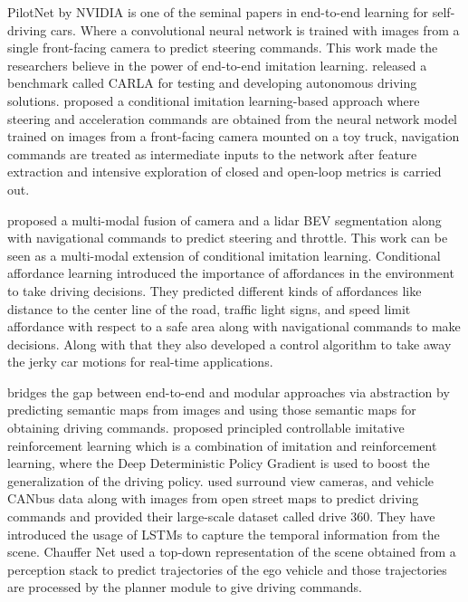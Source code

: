 \cite{DBLP:journals/corr/BojarskiTDFFGJM16} PilotNet by NVIDIA is one of the seminal papers in end-to-end learning for self-driving cars. Where a convolutional neural network is trained with images from a single front-facing camera to predict steering commands.  This work made the researchers believe in the power of end-to-end imitation learning. \cite{DBLP:journals/corr/abs-1711-03938} released a benchmark called CARLA for testing and developing autonomous driving solutions. \cite{DBLP:journals/corr/abs-1710-02410} proposed a conditional imitation learning-based approach where steering and acceleration commands are obtained from the neural network model trained on images from a front-facing camera mounted on a toy truck, navigation commands are treated as intermediate inputs to the network after feature extraction and intensive exploration of closed and open-loop metrics is carried out.

\cite{Sobh2018EndToEndMS} proposed a multi-modal fusion of camera and a lidar BEV segmentation along with navigational commands to predict steering and throttle. This work can be seen as a multi-modal extension of conditional imitation learning. Conditional affordance learning \cite{DBLP:journals/corr/abs-1806-06498} introduced the importance of affordances in the environment to take driving decisions. They predicted different kinds of affordances like distance to the center line of the road, traffic light signs, and speed limit affordance with respect to a safe area along with navigational commands to make decisions. Along with that they also developed a control algorithm to take away the jerky car motions for real-time applications.  


\cite{DBLP:journals/corr/abs-1804-09364} bridges the gap between end-to-end and modular approaches via abstraction by predicting semantic maps from images and using those semantic maps for obtaining driving commands. \cite{DBLP:journals/corr/abs-1807-03776} proposed principled controllable imitative reinforcement learning which is a combination of imitation and reinforcement learning, where the Deep Deterministic Policy Gradient is used to boost the generalization of the driving policy. \cite{DBLP:journals/corr/abs-1803-10158} used surround view cameras, and vehicle CANbus data along with images from open street maps to predict driving commands and provided their large-scale dataset called drive 360. They have introduced the usage of LSTMs to capture the temporal information from the scene. Chauffer Net \cite{DBLP:journals/corr/abs-1812-03079} used a top-down representation of the scene obtained from a perception stack to predict trajectories of the ego vehicle and those trajectories are processed by the planner module to give driving commands. 

